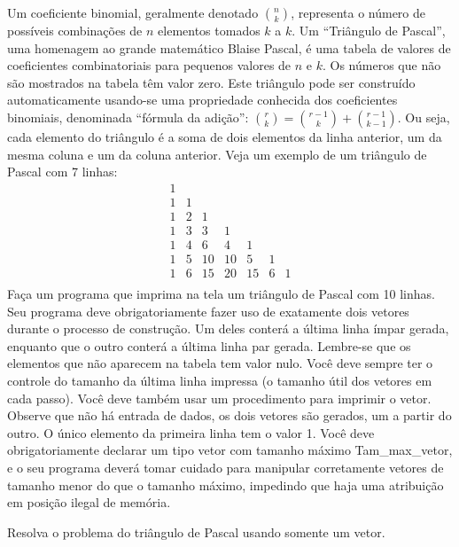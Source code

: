 \item   Um coeficiente binomial, geralmente denotado
  $\binom{n}{k}$, representa o número de possíveis combinações de $n$
  elementos tomados $k$ a $k$. Um ``Triângulo de Pascal'', uma homenagem
  ao grande matemático Blaise Pascal, é uma tabela de valores de
  coeficientes combinatoriais para pequenos valores de $n$ e $k$. Os
  números que não são mostrados na tabela têm valor zero. Este triângulo
  pode ser construído automaticamente usando-se uma propriedade
  conhecida dos coeficientes binomiais, denominada ``fórmula da
  adição'':
$\binom{r}{k} = \binom{r-1}{k} + \binom{r-1}{k-1}.$
Ou seja, cada elemento do triângulo é a soma de dois elementos da linha
anterior, um da mesma coluna e um da coluna anterior. 
Veja  um  exemplo de  um  triângulo  de Pascal  com  7  linhas:
\[\begin{array}{ccccccc}
1 \\
1 & 1 \\
1 & 2 & 1 \\
1 & 3 & 3 & 1 \\
1 & 4 & 6 & 4 & 1 \\
1 & 5 & 10 & 10 & 5 & 1 \\
1 & 6 & 15 & 20 & 15 & 6 & 1 \\
\end{array}
\]
Faça um programa que imprima na tela um triângulo de Pascal
com 10 linhas.  Seu programa deve obrigatoriamente fazer uso de
exatamente dois vetores durante o processo de construção. Um deles
conterá a última linha ímpar gerada, enquanto que o outro conterá a
última linha par gerada. Lembre-se que os elementos que não aparecem na
tabela tem valor nulo. Você deve sempre ter o controle do tamanho da
última linha impressa (o tamanho útil dos vetores em cada passo). Você
deve também usar um procedimento para imprimir o vetor. Observe que não
há entrada de dados, os dois vetores são gerados, um a partir do outro.
O único elemento da primeira linha tem o valor 1. Você deve
obrigatoriamente declarar um tipo vetor com tamanho máximo
Tam\_max\_vetor, e o seu programa deverá tomar cuidado para manipular
corretamente vetores de tamanho menor do que o tamanho máximo, impedindo
que haja uma atribuição em posição ilegal de memória. 


\item Resolva o problema do triângulo de Pascal usando somente um vetor.

